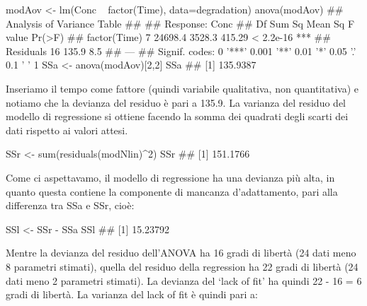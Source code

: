 \documentclass[a4paper,12pt,oneside]{book}
\newenvironment{Shaded}{}{}
\newcommand{\KeywordTok}[1]{#1}
\newcommand{\DataTypeTok}[1]{#1}
\newcommand{\DecValTok}[1]{#1}
\newcommand{\StringTok}[1]{#1}
\newcommand{\CommentTok}[1]{#1}
\newcommand{\OperatorTok}[1]{#1}
\newcommand{\NormalTok}[1]{#1}
\begin{document}
\begin{Shaded}
\begin{Highlighting}[]
\NormalTok{modAov <-}\StringTok{ }\KeywordTok{lm}\NormalTok{(Conc }\OperatorTok{~}\StringTok{ }\KeywordTok{factor}\NormalTok{(Time), }\DataTypeTok{data=}\NormalTok{degradation)}
\KeywordTok{anova}\NormalTok{(modAov)}
\CommentTok{## Analysis of Variance Table}
\CommentTok{## }
\CommentTok{## Response: Conc}
\CommentTok{##              Df  Sum Sq Mean Sq F value    Pr(>F)    }
\CommentTok{## factor(Time)  7 24698.4  3528.3  415.29 < 2.2e-16 ***}
\CommentTok{## Residuals    16   135.9     8.5                      }
\CommentTok{## ---}
\CommentTok{## Signif. codes:  0 '***' 0.001 '**' 0.01 '*' 0.05 '.' 0.1 ' ' 1}
\NormalTok{SSa <-}\StringTok{ }\KeywordTok{anova}\NormalTok{(modAov)[}\DecValTok{2}\NormalTok{,}\DecValTok{2}\NormalTok{]}
\NormalTok{SSa}
\CommentTok{## [1] 135.9387}
\end{Highlighting}
\end{Shaded}

Inseriamo il tempo come fattore (quindi variabile qualitativa, non quantitativa) e notiamo che la devianza del residuo è pari a 135.9. La varianza del residuo del modello di regressione si ottiene facendo la somma dei quadrati degli scarti dei dati rispetto ai valori attesi.

\begin{Shaded}
\begin{Highlighting}[]
\NormalTok{SSr <-}\StringTok{ }\KeywordTok{sum}\NormalTok{(}\KeywordTok{residuals}\NormalTok{(modNlin)}\OperatorTok{^}\DecValTok{2}\NormalTok{)}
\NormalTok{SSr}
\CommentTok{## [1] 151.1766}
\end{Highlighting}
\end{Shaded}

Come ci aspettavamo, il modello di regressione ha una devianza più alta, in quanto questa contiene la componente di mancanza d'adattamento, pari alla differenza tra SSa e SSr, cioè:

\begin{Shaded}
\begin{Highlighting}[]
\NormalTok{SSl <-}\StringTok{ }\NormalTok{SSr }\OperatorTok{-}\StringTok{ }\NormalTok{SSa}
\NormalTok{SSl}
\CommentTok{## [1] 15.23792}
\end{Highlighting}
\end{Shaded}

Mentre la devianza del residuo dell'ANOVA ha 16 gradi di libertà (24 dati meno 8 parametri stimati), quella del residuo della regression ha 22 gradi di libertà (24 dati meno 2 parametri stimati). La devianza del `lack of fit' ha quindi 22 - 16 = 6 gradi di libertà. La varianza del lack of fit è quindi pari a:
\end{document}
